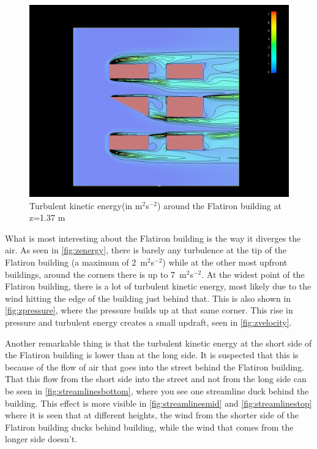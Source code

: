 \begin{figure}[h!]
\centering
\includegraphics[width = \textwidth]{zenergy.png}
\caption{Turbulent kinetic energy(in m$^2$s$^{-2}$) around the Flatiron building at z=1.37 m}
\label{fig:zenergy}
\end{figure}

What is most interesting about the Flatiron building is the way it diverges the air. As seen in \autoref{fig:zenergy}, there is barely any turbulence at the tip of the Flatiron building (a maximum of 2~m$^2$s$^{-2}$) while at the other most upfront buildings, around the corners there is up to 7~m$^2$s$^{-2}$. At the widest point of the Flatiron building, there is a lot of turbulent kinetic energy, most likely due to the wind hitting the edge of the building just behind that. This is also shown in \autoref{fig:zpressure}, where the pressure builds up at that same corner. This rise in pressure and turbulent energy creates a small updraft, seen in \autoref{fig:zvelocity}.

Another remarkable thing is that the turbulent kinetic energy at the short side of the Flatiron building is lower than at the long side. It is suspected that this is because of the flow of air that goes into the street behind the Flatiron building. That this flow from the short side into the street and not from the long side can be seen in \autoref{fig:streamlinesbottom}, where you see one streamline duck behind the building. This effect is more visible in \autoref{fig:streamlinesmid} and \autoref{fig:streamlinestop} where it is seen that at different heights, the wind from the shorter side of the Flatiron building ducks behind building, while the wind that comes from the longer side doesn't. 
